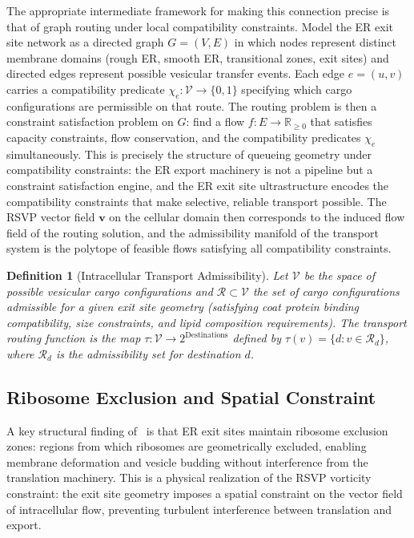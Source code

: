 \documentclass[11pt, oneside]{article}
\numberwithin{equation}{section}
\theoremstyle{rsvpstyle}
\newtheorem{definition}[theorem]{Definition}
\theoremstyle{remark}
\newcommand{\vfield}{\mathbf{v}}
\newcommand{\Rspace}{\mathbb{R}}
\begin{document}
The appropriate intermediate framework for making this connection precise is that of
graph routing under local compatibility constraints. Model the ER exit site network as
a directed graph $G = (V, E)$ in which nodes represent distinct membrane domains
(rough ER, smooth ER, transitional zones, exit sites) and directed edges represent
possible vesicular transfer events. Each edge $e = (u, v)$ carries a compatibility
predicate $\chi_e : \mathcal{V} \to \{0,1\}$ specifying which cargo configurations
are permissible on that route. The routing problem is then a constraint satisfaction
problem on $G$: find a flow $f : E \to \Rspace_{\geq 0}$ that satisfies capacity
constraints, flow conservation, and the compatibility predicates $\chi_e$ simultaneously.
This is precisely the structure of queueing geometry under compatibility constraints:
the ER export machinery is not a pipeline but a constraint satisfaction engine, and
the ER exit site ultrastructure encodes the compatibility constraints that make
selective, reliable transport possible. The RSVP vector field $\vfield$ on the cellular
domain then corresponds to the induced flow field of the routing solution, and the
admissibility manifold of the transport system is the polytope of feasible flows
satisfying all compatibility constraints.


\begin{definition}[Intracellular Transport Admissibility]
Let $\mathcal{V}$ be the space of possible vesicular cargo configurations and
$\mathcal{R} \subset \mathcal{V}$ the set of cargo configurations admissible for
a given exit site geometry (satisfying coat protein binding compatibility, size
constraints, and lipid composition requirements). The transport routing function
is the map $\tau : \mathcal{V} \to 2^{\text{Destinations}}$ defined by
$\tau(v) = \{d : v \in \mathcal{R}_d\}$, where $\mathcal{R}_d$ is the admissibility
set for destination $d$.
\end{definition}

\subsection{Ribosome Exclusion and Spatial Constraint}

A key structural finding of~\cite{Downes2026ERES} is that ER exit sites maintain
ribosome exclusion zones: regions from which ribosomes are geometrically excluded,
enabling membrane deformation and vesicle budding without interference from the
translation machinery. This is a physical realization of the RSVP vorticity constraint:
the exit site geometry imposes a spatial constraint on the vector field of intracellular
flow, preventing turbulent interference between translation and export.
\end{document}
